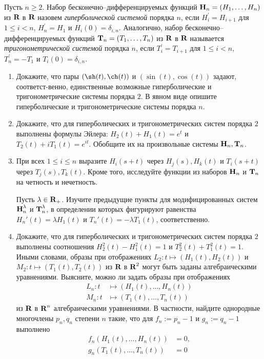 ﻿
\newcommand{\mmH}{\text{\bfseries H}}
\newcommand{\mmT}{\text{\bfseries T}}

Пусть $n \geq 2$. Набор бесконечно--дифференцируемых функций $\mmH_n = (H_1, \ldots, H_n)$ из $\text{\bfseries R}$ в $\text{\bfseries R}$ назовем {\itshape гиперболической системой} порядка $n$, если $H_i^\prime = H_{i+1}$ для $1 \leq i < n$, $H_n^\prime = H_1$ и $H_i(0) = \delta_{i,n}$. Аналогично, набор бесконечно--дифференцируемых функций $\mmT_n = (T_1, \ldots, T_n)$ из $\text{\bfseries R}$ в $\text{\bfseries R}$ называется {\itshape тригонометрической системой} порядка $n$, если $T_i^\prime = T_{i+1}$ для $1 \leq i < n$, $T_n^\prime = - T_1$ и $T_i(0) = \delta_{i,n}$. 

\begin{enumerate}
\item Докажите, что пары $\left(\sh(t), \ch(t)  \right)$ и $\left(\sin(t), \cos(t)\right)$ задают, соответст-\linebreak венно, единственные возможные гиперболические и тригонометрические системы порядка $2$. В явном виде опишите гиперболические и тригонометрические системы порядка $n$. 

\item Докажите, что для гиперболических и тригонометрических систем порядка $2$ выполнены
формулы Эйлера: $H_2(t) + H_1(t) = e^t$ и $T_2(t) + i T_1(t) = e^{it}.$ Обобщите их на произвольные системы $\mmH_n, \mmT_n$.

\item При всех $1 \leq i \leq n$ выразите $H_i(s+t)$ через $H_j(s), H_k(t)$ и $T_i(s+t)$ через $T_j(s), T_k(t)$. Кроме того, исследуйте функции из наборов $\mmH_n$ и $\mmT_n$ на четность и нечетность.

Пусть $\lambda \in \text{\bfseries R}_+$. Изучите предыдущие пункты для модифицированных систем $\mmH_n^\lambda$ и $\mmT_n^\lambda$, в определении которых фигурируют равенства $H_n'(t) = \lambda H_1(t)$ и $T_n'(t) = -\lambda T_1(t)$, соответственно.
\item Докажите, что для гиперболических и тригонометрических систем порядка $2$ выполнены соотношения $H_2^2(t) - H_1^2(t) = 1$ и $T_2^2(t) + T_1^2(t) = 1.$ Иными словами, образы при отображениях $L_2: t \mapsto (H_1(t), H_2(t))$ и $M_2: t \mapsto (T_1(t), T_2(t))$ из $\text{\bfseries R}$ в $\text{\bfseries R}^2$ могут быть заданы алгебраическими уравнениями. Выясните, можно ли задать образы при отображениях 
\begin{align*}
L_n: t &\longmapsto (H_1(t), \ldots, H_n(t)) \\
M_n: t &\longmapsto (T_1(t), \ldots, T_n(t))
\end{align*}
из $\text{\bfseries R}$ в $\text{\bfseries R}^n$ алгебраическими уравнениями. В частности, найдите однородные многочлены $p_n, q_n$ степени $n$ такие, что для $f_n:=p_n - 1$ и $g_n := q_n-1$ выполнено
\begin{align*}
f_n(H_1(t), \ldots, H_n(t)) &= 0, \\
g_n(T_1(t), \ldots, T_n(t)) &= 0
\end{align*} 


\end{enumerate}
